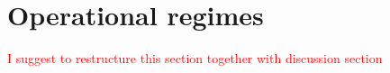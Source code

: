 \documentclass[twocolumn,superscriptaddress,unsortedaddress,
 amsmath,amssymb,
 aps,
]{revtex4-2}
\begin{document}
% 
% 

 
\section{Operational regimes}
    \textcolor{red}{I suggest to restructure this section together with discussion section}
    
\end{document}
